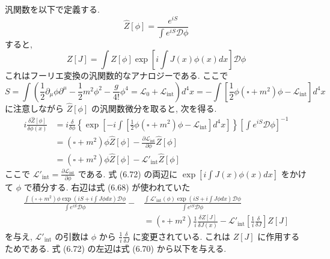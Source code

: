 \documentclass{jsarticle}
\begin{document}
汎関数を以下で定義する.
\begin{equation*}
    \hat{Z}[\phi] = \frac{e^{iS}}{\displaystyle \int e^{iS}\mathcal{D}\phi} \tag{6.69}
\end{equation*}
すると,
\begin{equation*}
    Z[J] = \int \hat{Z}[\phi]\exp\left[ i\int J(x)\phi(x) dx \right] \mathcal{D}\phi \tag{6.70}
\end{equation*}
これはフーリエ変換の汎関数的なアナロジーである. ここで
\begin{equation*}
    S = \int \left(\frac{1}{2}\partial_\mu \phi \partial^\mu -\frac{1}{2}m^2 \phi^2 -\frac{g}{4!}\phi^4 = \mathcal{L}_0 + \mathcal{L}_\textrm{int}\right) d^4 x = -\int \left[ \frac{1}{2}\phi (\square + m^2)\phi - \mathcal{L}_\textrm{int} \right] d^4 x \tag{6.71}
\end{equation*}
に注意しながら $\hat{Z}[\phi]$ の汎関数微分を取ると, 次を得る.
\begin{align*}
    i\frac{\delta \hat{Z}[\phi]}{\delta \phi(x)} &= i\frac{\delta}{\delta \phi}\left\{ \exp\left[ -i\int \left[ \frac{1}{2}\phi (\square + m^2)\phi - \mathcal{L}_\textrm{int} \right]d^4 x \right] \right\}\left[ \int e^{iS}\mathcal{D}\phi \right]^{-1}\\
    &= (\square + m^2)\phi \hat{Z}[\phi] -\frac{\partial \mathcal{L}_\textrm{int}}{\partial \phi}\hat{Z}[\phi]\\
    &= (\square + m^2)\phi \hat{Z}[\phi] - \mathcal{L}'_\textrm{int}\hat{Z}[\phi] \tag{6.72}
\end{align*}
ここで $\mathcal{L}'_\textrm{int} = \displaystyle \frac{\partial \mathcal{L}_\textrm{int}}{\partial \phi}$ である. 式 (6.72) の両辺に $\displaystyle \exp\left[ i\int J(x)\phi(x)dx \right]$ をかけて $\phi$ で積分する. 右辺は式 (6.68) が使われていた
\begin{align*}
    \frac{\displaystyle \int (\square + m^2)\phi \exp\left( iS + i\int J\phi dx \right)\mathcal{D}\phi}{\displaystyle \int e^{iS}\mathcal{D}\phi} -& \frac{\displaystyle \int \mathcal{L}'_{\textrm{int}}(\phi) \exp\left( iS + i\int J\phi dx \right)\mathcal{D}\phi}{\displaystyle \int e^{iS}\mathcal{D}\phi} \\
    &= (\square + m^2)\frac{1}{i}\frac{\delta Z[J]}{\delta J(x)} - \mathcal{L}'_{\textrm{int}}\left[ \frac{1}{i}\frac{\delta}{\delta J} \right]Z[J] \tag{6.73}
\end{align*}
を与え, $\mathcal{L}'_{\textrm{int}}$ の引数は $\phi$ から $\displaystyle \frac{1}{i}\frac{\delta}{\delta J}$ に変更されている. これは $Z[J]$ に作用するためである. 式 (6.72) の左辺は式 (6.70) から以下を与える.
\end{document}
